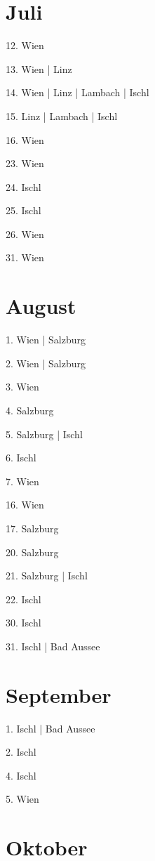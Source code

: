 \documentclass[twoside=false,titlepage=false,open=any, parskip=never, fontsize=10pt, headings=small, chapterprefix=false, appendixprefix=false, DIV=15]{scrbook}
\begin{document}
\begin{multicols}{3}
            \section*{Juli}
            12. Wien\par
            13. Wien | Linz\par
            14. Wien | Linz | Lambach | Ischl\par
            15. Linz | Lambach | Ischl\par
            16. Wien\par
            23. Wien\par
            24. Ischl\par
            25. Ischl\par
            26. Wien\par
            31. Wien\par
            \section*{August}
            1. Wien | Salzburg\par
            2. Wien | Salzburg\par
            3. Wien\par
            4. Salzburg\par
            5. Salzburg | Ischl\par
            6. Ischl\par
            7. Wien\par
            16. Wien\par
            17. Salzburg\par
            20. Salzburg\par
            21. Salzburg | Ischl\par
            22. Ischl\par
            30. Ischl\par
            31. Ischl | Bad Aussee\par
            \section*{September}
            1. Ischl | Bad Aussee\par
            2. Ischl\par
            4. Ischl\par
            5. Wien\par
            \section*{Oktober}

\end{multicols}
\end{document}
